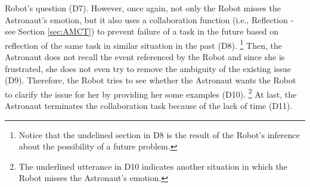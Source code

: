 Robot's question (D7). However, once again, not only the Robot misses the
Astronaut's emotion, but it also uses a collaboration function (i.e., Reflection
- see Section \ref{sec:AMCT}) to prevent failure of a task in the future based
on reflection of the same task in similar situation in the past (D8).
\footnote{Notice that the undelined section in D8 is the result of the Robot's
inference about the possibility of a future problem.} Then, the Astronaut does
not recall the event referenced by the Robot and since she is frustrated, she
does not even try to remove the ambiguity of the existing issue (D9). Therefore,
the Robot tries to see whether the Astronaut wants the Robot to clarify the
issue for her by providing her some examples (D10). \footnote{The underlined
utterance in D10 indicates another situation in which the Robot misses the
Astronaut's emotion.} At last, the Astronaut terminates the collaboration task
because of the lack of time (D11).\\

